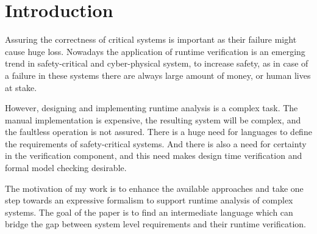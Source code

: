 \chapter{Introduction}
\label{chap:intro}

Assuring the correctness of critical systems is important as their failure might cause huge loss.
Nowadays the application of runtime verification is an emerging trend in safety-critical and cyber-physical system, to increase safety, as in case of a failure in these systems there are always large amount of money, or human lives at stake. 

However, designing and implementing runtime analysis is a complex task. The manual implementation is expensive, the resulting system will be complex, and the faultless operation is not assured.
There is a huge need for languages to define the requirements of safety-critical systems.
And there is also a need for certainty in the verification component, and this need makes design time verification and formal model checking desirable. 

The motivation of my work is to enhance the available approaches and take one step towards an expressive formalism to support runtime analysis of complex systems.
The goal of the paper is to find an intermediate language which can bridge the gap between system level requirements and their runtime verification.


